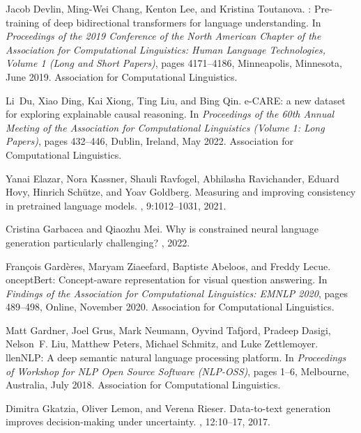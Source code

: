 \documentclass[11pt]{article}
\begin{document}
\begin{thebibliography}{100}
Jacob Devlin, Ming-Wei Chang, Kenton Lee, and Kristina Toutanova.
: Pre-training of deep bidirectional transformers for language
  understanding.
\newblock In {\em Proceedings of the 2019 Conference of the North {A}merican
  Chapter of the Association for Computational Linguistics: Human Language
  Technologies, Volume 1 (Long and Short Papers)}, pages 4171--4186,
  Minneapolis, Minnesota, June 2019. Association for Computational Linguistics.

Li~Du, Xiao Ding, Kai Xiong, Ting Liu, and Bing Qin.
\newblock e-{CARE}: a new dataset for exploring explainable causal reasoning.
\newblock In {\em Proceedings of the 60th Annual Meeting of the Association for
  Computational Linguistics (Volume 1: Long Papers)}, pages 432--446, Dublin,
  Ireland, May 2022. Association for Computational Linguistics.

Yanai Elazar, Nora Kassner, Shauli Ravfogel, Abhilasha Ravichander, Eduard
  Hovy, Hinrich Sch{\"u}tze, and Yoav Goldberg.
\newblock Measuring and improving consistency in pretrained language models.
,
  9:1012--1031, 2021.

Cristina Garbacea and Qiaozhu Mei.
\newblock Why is constrained neural language generation particularly
  challenging?
, 2022.

Fran{\c{c}}ois Gard{\`e}res, Maryam Ziaeefard, Baptiste Abeloos, and Freddy
  Lecue.
oncept{B}ert: Concept-aware representation for visual question
  answering.
\newblock In {\em Findings of the Association for Computational Linguistics:
  EMNLP 2020}, pages 489--498, Online, November 2020. Association for
  Computational Linguistics.

Matt Gardner, Joel Grus, Mark Neumann, Oyvind Tafjord, Pradeep Dasigi,
  Nelson~F. Liu, Matthew Peters, Michael Schmitz, and Luke Zettlemoyer.
llen{NLP}: A deep semantic natural language processing platform.
\newblock In {\em Proceedings of Workshop for {NLP} Open Source Software
  ({NLP}-{OSS})}, pages 1--6, Melbourne, Australia, July 2018. Association for
  Computational Linguistics.

Dimitra Gkatzia, Oliver Lemon, and Verena Rieser.
\newblock Data-to-text generation improves decision-making under uncertainty.
, 12:10--17, 2017.


\end{thebibliography}
\end{document}
